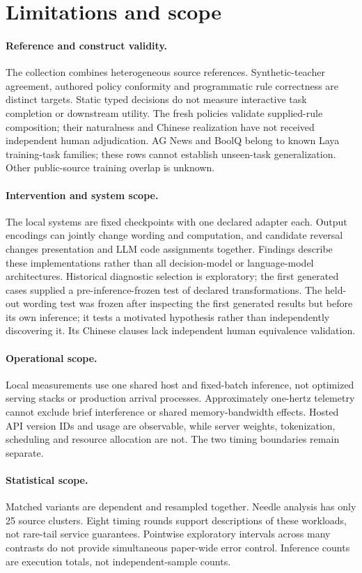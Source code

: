 \section{Limitations and scope}
\paragraph{Reference and construct validity.}
The collection combines heterogeneous source references. Synthetic-teacher agreement, authored policy conformity and programmatic rule correctness are distinct targets. Static typed decisions do not measure interactive task completion or downstream utility. The fresh policies validate supplied-rule composition; their naturalness and Chinese realization have not received independent human adjudication. AG News and BoolQ belong to known Laya training-task families; these rows cannot establish unseen-task generalization. Other public-source training overlap is unknown.

\paragraph{Intervention and system scope.}
The local systems are fixed checkpoints with one declared adapter each. Output encodings can jointly change wording and computation, and candidate reversal changes presentation and LLM code assignments together. Findings describe these implementations rather than all decision-model or language-model architectures. Historical diagnostic selection is exploratory; the first generated cases supplied a pre-inference-frozen test of declared transformations. The held-out wording test was frozen after inspecting the first generated results but before its own inference; it tests a motivated hypothesis rather than independently discovering it. Its Chinese clauses lack independent human equivalence validation.

\paragraph{Operational scope.}
Local measurements use one shared host and fixed-batch inference, not optimized serving stacks or production arrival processes. Approximately one-hertz telemetry cannot exclude brief interference or shared memory-bandwidth effects. Hosted API version IDs and usage are observable, while server weights, tokenization, scheduling and resource allocation are not. The two timing boundaries remain separate.

\paragraph{Statistical scope.}
Matched variants are dependent and resampled together. Needle analysis has only 25 source clusters. Eight timing rounds support descriptions of these workloads, not rare-tail service guarantees. Pointwise exploratory intervals across many contrasts do not provide simultaneous paper-wide error control. Inference counts are execution totals, not independent-sample counts.
